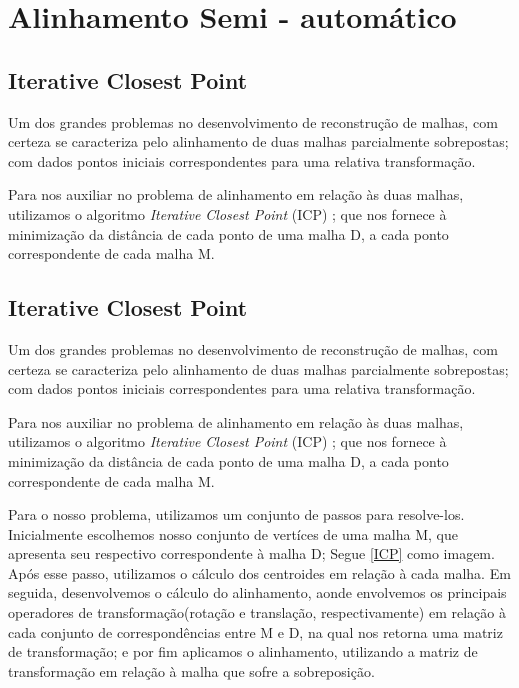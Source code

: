 \section{Alinhamento Semi - automático}
\label{sec:technique}

\subsection{Iterative Closest Point}

Um dos grandes problemas no desenvolvimento de reconstrução de malhas, com certeza se caracteriza pelo alinhamento de duas malhas parcialmente sobrepostas; com dados pontos iniciais correspondentes para uma relativa transformação.

Para nos auxiliar no problema de alinhamento em relação às duas malhas, utilizamos o algoritmo \textit{Iterative Closest Point} (ICP) \cite{Zhang:1994}; que nos fornece à minimização da distância de cada ponto de uma malha D, a cada ponto correspondente de cada malha M.

\subsection{Iterative Closest Point}

Um dos grandes problemas no desenvolvimento de reconstrução de malhas, com certeza se caracteriza pelo alinhamento de duas malhas parcialmente sobrepostas; com dados pontos iniciais correspondentes para uma relativa transformação.

Para nos auxiliar no problema de alinhamento em relação às duas malhas, utilizamos o algoritmo \textit{Iterative Closest Point} (ICP) \cite{Zhang:1994}; que nos fornece à minimização da distância de cada ponto de uma malha D, a cada ponto correspondente de cada malha M.

Para o nosso problema, utilizamos um conjunto de passos para resolve-los. Inicialmente escolhemos nosso conjunto de vertíces de uma malha M, que apresenta seu respectivo correspondente à malha D; Segue \ref{ICP} como imagem. Após esse passo, utilizamos o cálculo dos centroides em relação à cada malha. Em seguida, desenvolvemos o cálculo do alinhamento, aonde envolvemos os principais operadores de transformação(rotação e translação, respectivamente) em relação à cada conjunto de correspondências entre M e D, na qual nos retorna uma matriz de transformação; e por fim aplicamos o alinhamento, utilizando a matriz de transformação em relação à malha que sofre a sobreposição.

